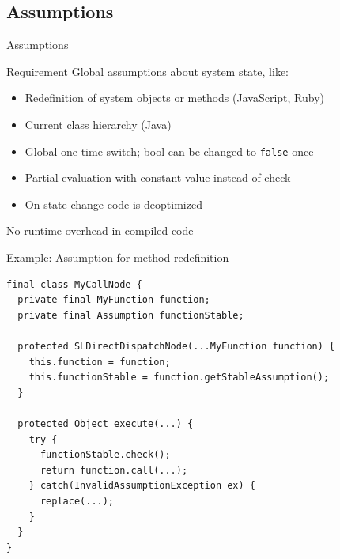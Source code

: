 \documentclass[xcolor=dvipsname]{beamer}
\begin{document}
\subsection{Assumptions}
\begin{frame}{Assumptions}
    \begin{alertblock}{Requirement}
        Global assumptions about system state, like:
        \begin{itemize}
          \item Redefinition of system objects or methods (JavaScript, Ruby)
          \item Current class hierarchy (Java)
        \end{itemize}
    \end{alertblock}
    \pause
    \vfill
    \begin{itemize}
        \item Global one-time switch; bool can be changed to \lstinline{false} once
        \pause
        \item Partial evaluation with constant value instead of check
        \pause
        \item On state change code is deoptimized
    \end{itemize}
    \pause
    \begin{center}
        \alert{No runtime overhead in compiled code}
    \end{center}
\end{frame}
\begin{frame}[fragile]{Example: Assumption for method redefinition}
  \begin{lstlisting}
final class MyCallNode {
  private final MyFunction function;
  private final Assumption functionStable;

  protected SLDirectDispatchNode(...MyFunction function) {
    this.function = function;
    this.functionStable = function.getStableAssumption();
  }

  protected Object execute(...) {
    try {
      functionStable.check();
      return function.call(...);
    } catch(InvalidAssumptionException ex) {
      replace(...);
    }
  }
}
  \end{lstlisting}
\end{frame}
\end{document}

